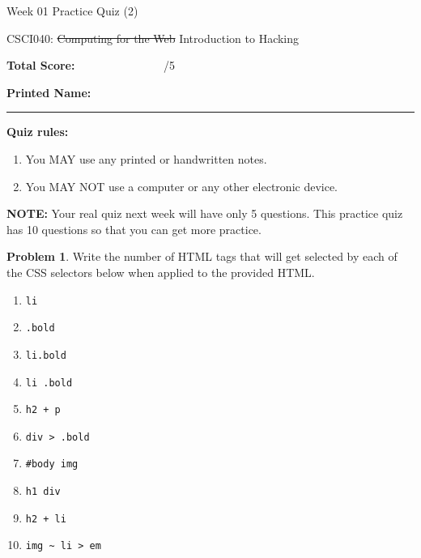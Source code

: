 \documentclass[10pt]{article}
\theoremstyle{definition}
\newtheorem{problem}{Problem}
\begin{document}
\begin{center}
    {
\Large
Week 01 Practice Quiz (2)
}

    \vspace{0.1in}
    CSCI040: \sout{Computing for the Web} Introduction to Hacking

    \vspace{0.1in}
\end{center}

\vspace{0.15in}
\noindent
\textbf{Total Score:} ~~~~~~~~~~~~~~~/5

\vspace{0.5in}
\noindent
\textbf{Printed Name:}

\noindent
\rule{\textwidth}{0.1pt}
\vspace{0.25in}

\noindent
\textbf{Quiz rules:}
\begin{enumerate}
    \item You MAY use any printed or handwritten notes.
    \item You MAY NOT use a computer or any other electronic device.
\end{enumerate}

\noindent
\textbf{NOTE:}
Your real quiz next week will have only 5 questions.
This practice quiz has 10 questions so that you can get more practice.

\vspace{0.15in}

\noindent
\begin{problem}
    Write the number of HTML tags that will get selected by each of the CSS selectors below when applied to the provided HTML.

\begin{enumerate}[before=\setlength{\baselineskip}{8mm}]

    \item
    \lstinline{li}

    \item
    \lstinline{.bold}

    \item
    \lstinline{li.bold}

    \item
    \lstinline{li .bold}

    \item
    \lstinline{h2 + p}

    \item
    \lstinline{div > .bold}

    \item
    \lstinline{#body img}

    \item
    \lstinline{h1 div}

    \item
    \lstinline{h2 + li}

    \item
    \lstinline{img ~ li > em}

\end{enumerate}
\end{problem}
\end{document}
